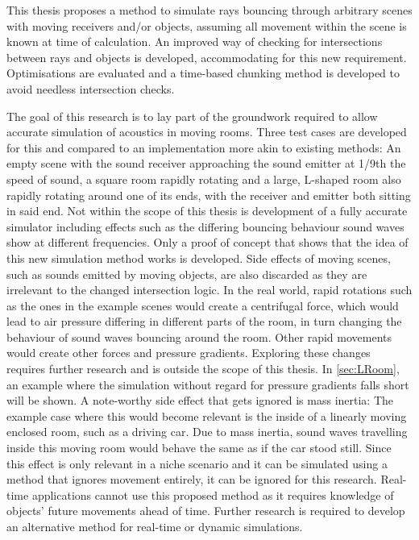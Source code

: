 This thesis proposes a method to simulate rays bouncing through arbitrary scenes with moving receivers and/or objects,
assuming all movement within the scene is known at time of calculation.
An improved way of checking for intersections between rays and objects is developed, accommodating for this new requirement.
\newline
Optimisations are evaluated and a time-based chunking method is developed to avoid needless intersection checks.
\iffalse
    Additionally, a method is developed to to losslessly and efficiently store the multiple impulse responses created by re-calculating
    the impulse responses for different points in time.
\fi
\newline
The goal of this research is to lay part of the groundwork required to allow accurate simulation of acoustics in moving rooms.
\newline
Three test cases are developed for this and compared to an implementation more akin to existing methods:
An empty scene with the sound receiver approaching the sound emitter at 1/9th the speed of sound,
a square room rapidly rotating
and a large, L-shaped room also rapidly rotating around one of its ends, with the receiver and emitter both sitting in said end.
\newline
Not within the scope of this thesis is development of a fully accurate simulator
including effects such as the differing bouncing behaviour sound waves show at different frequencies.
Only a proof of concept that shows that the idea of this new simulation method works is developed.
\newline
Side effects of moving scenes, such as sounds emitted by moving objects, are also discarded as they are irrelevant to
the changed intersection logic.
\newline
In the real world, rapid rotations such as the ones in the example scenes would create a centrifugal force,
which would lead to air pressure differing in different parts of the room,
in turn changing the behaviour of sound waves bouncing around the room.
Other rapid movements would create other forces and pressure gradients.
Exploring these changes requires further research and is outside the scope of this thesis.
In \autoref{sec:LRoom}, an example where the simulation without regard for pressure gradients falls short will be shown.
\newline
A note-worthy side effect that gets ignored is mass inertia:
The example case where this would become relevant is the inside of a linearly moving enclosed room, such as a driving car.
Due to mass inertia, sound waves travelling inside this moving room would behave the same as if the car stood still.
Since this effect is only relevant in a niche scenario and it can be simulated using a method that ignores movement entirely,
it can be ignored for this research.
\newline
Real-time applications cannot use this proposed method as it requires knowledge of objects' future movements ahead of time.
Further research is required to develop an alternative method for real-time or dynamic simulations.

